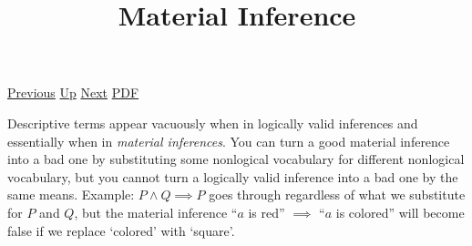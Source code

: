 \documentclass[12pt,a4paper]{report}
\begin{document}
 \href{doc/phil/People/Brandom/OnSellars/2009/Lecture02/SellarsStyle.html}{Previous} 
 \href{doc/phil/People/Brandom/OnSellars/2009/Lecture02.html}{Up} 
 \href{doc/phil/People/Brandom/OnSellars/2009/Lecture02/MaterialInferenceMainIdea.html}{Next} 
 \href{doc/phil/People/Brandom/OnSellars/2009/Lecture02/MaterialInference.pdf}{PDF} 
\title{Material Inference}

Descriptive terms appear vacuously when in logically valid inferences and essentially when in \emph{material inferences}. You can turn a good material inference into a bad one by substituting some nonlogical vocabulary for different nonlogical vocabulary, but you cannot turn a logically valid inference into a bad one by the same means. Example: $P \land Q \implies P$ goes through regardless of what we substitute for $P$ and $Q$, but the material inference ``$a$ is red'' $\implies$ ``$a$ is colored'' will become false if we replace `colored' with `square'.
\end{document}
